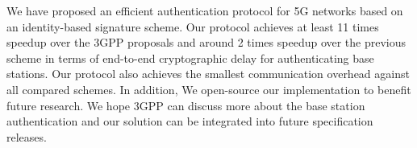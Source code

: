 We have proposed an efficient authentication protocol for 5G networks based on an identity-based signature scheme. Our protocol achieves at least 11 times speedup over the 3GPP proposals and around 2 times speedup over the previous scheme in terms of end-to-end cryptographic delay for authenticating base stations.
Our protocol also achieves the smallest communication overhead against all compared schemes. In addition, We open-source our implementation \cite{E2IBS-github} to benefit future research. 
We hope 3GPP can discuss more about the base station authentication and our solution can be integrated into future specification releases.
